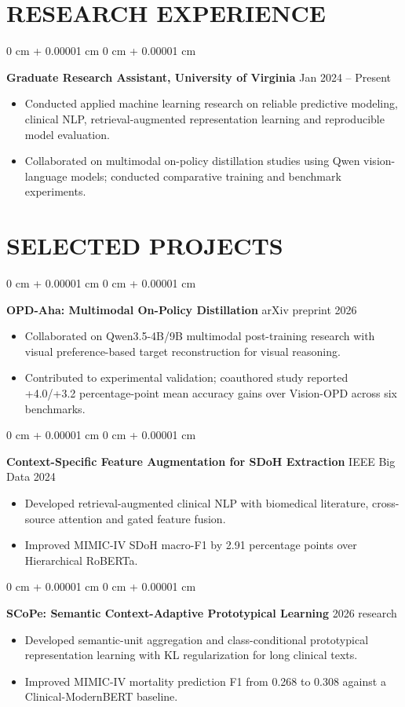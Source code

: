 \documentclass[10pt, letterpaper]{article}
\newenvironment{highlights}{
    \begin{itemize}[
        topsep=0.02 cm,
        parsep=0 cm,
        partopsep=0pt,
        itemsep=0pt,
        leftmargin=0 cm + 10pt
    ]
}{
    \end{itemize}
} %
\newenvironment{onecolentry}{
    \begin{adjustwidth}{
        0 cm + 0.00001 cm
    }{
        0 cm + 0.00001 cm
    }
}{
    \end{adjustwidth}
} %
\begin{document}
\section{RESEARCH EXPERIENCE}
\begin{onecolentry}
\textbf{Graduate Research Assistant, University of Virginia} \hfill Jan 2024 -- Present
\begin{highlights}
\item Conducted applied machine learning research on reliable predictive modeling, clinical NLP, retrieval-augmented representation learning and reproducible model evaluation.
\item Collaborated on multimodal on-policy distillation studies using Qwen vision-language models; conducted comparative training and benchmark experiments.
\end{highlights}
\end{onecolentry}
\section{SELECTED PROJECTS}
\begin{onecolentry}
\textbf{OPD-Aha: Multimodal On-Policy Distillation} \hfill arXiv preprint 2026
\begin{highlights}
\item Collaborated on Qwen3.5-4B/9B multimodal post-training research with visual preference-based target reconstruction for visual reasoning.
\item Contributed to experimental validation; coauthored study reported +4.0/+3.2 percentage-point mean accuracy gains over Vision-OPD across six benchmarks.
\end{highlights}
\end{onecolentry}
\vspace{0.04 cm}
\begin{onecolentry}
\textbf{Context-Specific Feature Augmentation for SDoH Extraction} \hfill IEEE Big Data 2024
\begin{highlights}
\item Developed retrieval-augmented clinical NLP with biomedical literature, cross-source attention and gated feature fusion.
\item Improved MIMIC-IV SDoH macro-F1 by 2.91 percentage points over Hierarchical RoBERTa.
\end{highlights}
\end{onecolentry}
\vspace{0.04 cm}
\begin{onecolentry}
\textbf{SCoPe: Semantic Context-Adaptive Prototypical Learning} \hfill 2026 research
\begin{highlights}
\item Developed semantic-unit aggregation and class-conditional prototypical representation learning with KL regularization for long clinical texts.
\item Improved MIMIC-IV mortality prediction F1 from 0.268 to 0.308 against a Clinical-ModernBERT baseline.
\end{highlights}
\end{onecolentry}
\vspace{0.04 cm}
\end{document}
